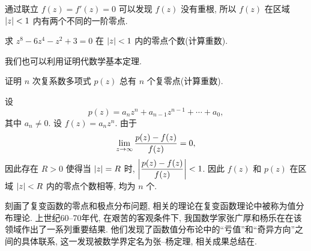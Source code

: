 通过联立 $f(z)=f'(z)=0$ 可以发现 $f(z)$ 没有重根, 所以 $f(z)$ 在区域 $\lvert z\rvert<1$ 内有两个不同的一阶零点.

\begin{exercise}
  求 $z^8-6z^4-z^2+3=0$ 在 $\lvert z\rvert<1$ 内的零点个数(计算重数).
\end{exercise}

我们也可以利用\thmRouche 证明代数学基本定理.
\begin{example}[代数学基本定理]
	证明 $n$ 次复系数多项式 $p(z)$ 总有 $n$ 个复零点(计算重数).
\end{example}

\begin{solution}
  设
  \[
    p(z)=a_nz^n+a_{n-1}z^{n-1}+\cdots+a_0,
  \]
  其中 $a_n\neq 0$.
  设 $f(z)=a_n z^n$.
  由于
  \[
    \lim_{z\rightarrow\infty}\frac{p(z)-f(z)}{f(z)}=0,
  \]
  因此存在 $R>0$ 使得当 $\lvert z\rvert=R$ 时, $\biggl\vert\dfrac{p(z)-f(z)}{f(z)}\biggr\vert<1$.
  因此 $f(z)$ 和 $p(z)$ 在区域 $\lvert z\rvert<R$ 内的零点个数相等, 均为 $n$ 个.
\end{solution}

\thmRouche 刻画了复变函数的零点和极点分布问题, 相关的理论在复变函数理论中被称为值分布理论. 上世纪60--70年代, 在艰苦的客观条件下, 我国数学家张广厚和杨乐在在该领域作出了一系列重要结果.
他们发现了函数值分布论中的``亏值''和``奇异方向''之间的具体联系, 这一发现被数学界定名为张--杨定理, 相关成果总结在\cite{YangZhang1975,YangZhang1976,Yang1993}.


\newpage
{}

